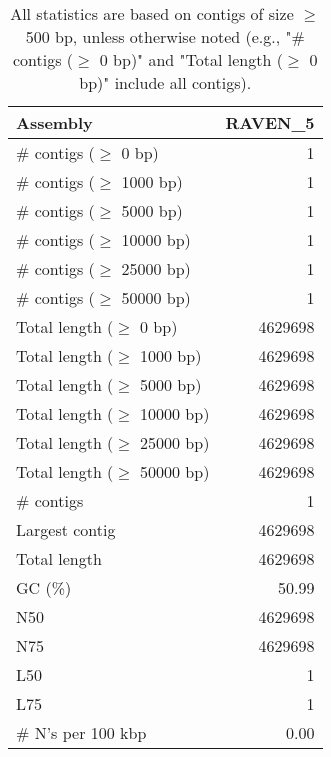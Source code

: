 \documentclass[12pt,a4paper]{article}
\begin{document}
\begin{table}[ht]
\begin{center}
\caption{All statistics are based on contigs of size $\geq$ 500 bp, unless otherwise noted (e.g., "\# contigs ($\geq$ 0 bp)" and "Total length ($\geq$ 0 bp)" include all contigs).}
\begin{tabular}{|l*{1}{|r}|}
\hline
Assembly & RAVEN\_5 \\ \hline
\# contigs ($\geq$ 0 bp) & 1 \\ \hline
\# contigs ($\geq$ 1000 bp) & 1 \\ \hline
\# contigs ($\geq$ 5000 bp) & 1 \\ \hline
\# contigs ($\geq$ 10000 bp) & 1 \\ \hline
\# contigs ($\geq$ 25000 bp) & 1 \\ \hline
\# contigs ($\geq$ 50000 bp) & 1 \\ \hline
Total length ($\geq$ 0 bp) & 4629698 \\ \hline
Total length ($\geq$ 1000 bp) & 4629698 \\ \hline
Total length ($\geq$ 5000 bp) & 4629698 \\ \hline
Total length ($\geq$ 10000 bp) & 4629698 \\ \hline
Total length ($\geq$ 25000 bp) & 4629698 \\ \hline
Total length ($\geq$ 50000 bp) & 4629698 \\ \hline
\# contigs & 1 \\ \hline
Largest contig & 4629698 \\ \hline
Total length & 4629698 \\ \hline
GC (\%) & 50.99 \\ \hline
N50 & 4629698 \\ \hline
N75 & 4629698 \\ \hline
L50 & 1 \\ \hline
L75 & 1 \\ \hline
\# N's per 100 kbp & 0.00 \\ \hline
\end{tabular}
\end{center}
\end{table}
\end{document}
